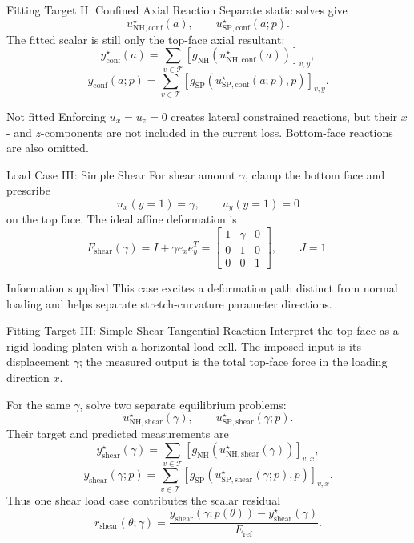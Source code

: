 \documentclass[aspectratio=169,10pt]{beamer}
\newcommand{\eref}{E_{\mathrm{ref}}}
\begin{document}
\begin{frame}{Fitting Target II: Confined Axial Reaction}
  \small
  Separate static solves give
  \[
    u_{\mathrm{NH,conf}}^\star(a),
    \qquad
    u_{\mathrm{SP,conf}}^\star(a;p).
  \]
  The fitted scalar is still only the top-face axial resultant:
  \[
    \boxed{
      y_{\mathrm{conf}}^\star(a)
      =
      \sum_{v\in\mathcal T}
      [g_{\mathrm{NH}}(u_{\mathrm{NH,conf}}^\star(a))]_{v,y}
    },
  \]
  \[
    \boxed{
      y_{\mathrm{conf}}(a;p)
      =
      \sum_{v\in\mathcal T}
      [g_{\mathrm{SP}}(u_{\mathrm{SP,conf}}^\star(a;p),p)]_{v,y}
    }.
  \]

  \begin{alertblock}{Not fitted}
    Enforcing $u_x=u_z=0$ creates lateral constrained reactions, but their
    $x$- and $z$-components are not included in the current loss. Bottom-face
    reactions are also omitted.
  \end{alertblock}
\end{frame}

\begin{frame}{Load Case III: Simple Shear}
  \small
  For shear amount $\gamma$, clamp the bottom face and prescribe
  \[
    u_x(y=1)=\gamma,
    \qquad
    u_y(y=1)=0
  \]
  on the top face. The ideal affine deformation is
  \[
    F_{\mathrm{shear}}(\gamma)
    =
    I+\gamma e_xe_y^T
    =
    \begin{bmatrix}
      1&\gamma&0\\
      0&1&0\\
      0&0&1
    \end{bmatrix},
    \qquad J=1.
  \]

  \begin{block}{Information supplied}
    This case excites a deformation path distinct from normal loading and
    helps separate stretch-curvature parameter directions.
  \end{block}
\end{frame}

\begin{frame}{Fitting Target III: Simple-Shear Tangential Reaction}
  \small
  Interpret the top face as a rigid loading platen with a horizontal load
  cell. The imposed input is its displacement $\gamma$; the measured output
  is the total top-face force in the loading direction $x$.

  For the same $\gamma$, solve two separate equilibrium problems:
  \[
    u_{\mathrm{NH,shear}}^\star(\gamma),
    \qquad
    u_{\mathrm{SP,shear}}^\star(\gamma;p).
  \]
  Their target and predicted measurements are
  \[
    \boxed{
      y_{\mathrm{shear}}^\star(\gamma)
      =
      \sum_{v\in\mathcal T}
      [g_{\mathrm{NH}}(u_{\mathrm{NH,shear}}^\star(\gamma))]_{v,x}
    },
  \]
  \[
    \boxed{
      y_{\mathrm{shear}}(\gamma;p)
      =
      \sum_{v\in\mathcal T}
      [g_{\mathrm{SP}}(u_{\mathrm{SP,shear}}^\star(\gamma;p),p)]_{v,x}
    }.
  \]
  Thus one shear load case contributes the scalar residual
  \[
    \boxed{
      r_{\mathrm{shear}}(\theta;\gamma)
      =
      \frac{
        y_{\mathrm{shear}}(\gamma;p(\theta))
        -y_{\mathrm{shear}}^\star(\gamma)
      }{\eref}
    }.
  \]
\end{frame}
\end{document}
